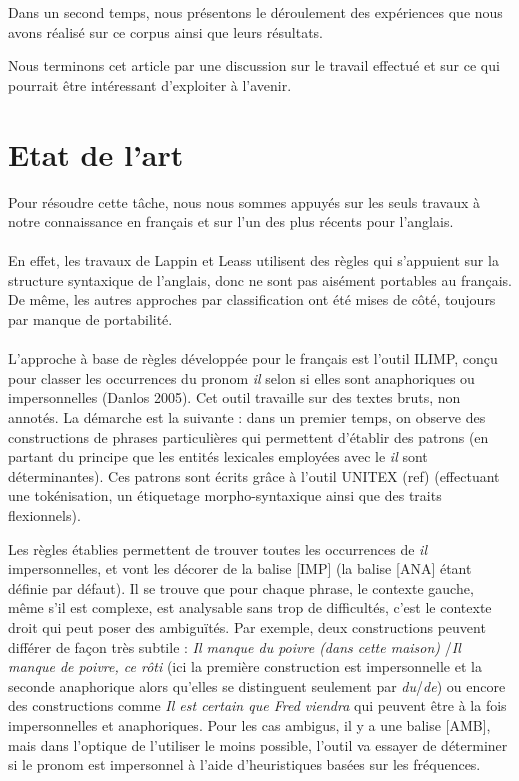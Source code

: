 \documentclass[a4paper,12pt]{article}
\begin{document}
Dans un second temps, nous présentons le déroulement des expériences que nous avons réalisé sur ce corpus ainsi que leurs résultats.

Nous terminons cet article par une discussion sur le travail effectué et sur ce qui pourrait être intéressant d'exploiter à l'avenir.


\section{Etat de l'art}

Pour résoudre cette tâche, nous nous sommes appuyés sur les seuls travaux à notre connaissance en français et sur l'un des plus récents pour l'anglais.

\paragraph{}
En effet, les travaux de Lappin et Leass utilisent des règles qui s'appuient sur la structure syntaxique de l'anglais, donc ne sont pas aisément portables au français. De même, les autres approches par classification ont été mises de côté, toujours par manque de portabilité.

\paragraph{}
L'approche à base de règles développée pour le français est l'outil ILIMP, conçu pour classer les occurrences du pronom \og{}\textit{il}\fg{} selon si elles sont anaphoriques ou impersonnelles (Danlos 2005). Cet outil travaille sur des textes bruts, non annotés.
La démarche est la suivante : dans un premier temps, on observe des constructions de phrases particulières qui permettent d'établir des patrons (en partant du principe que les entités lexicales employées avec le \og{}\textit{il}\fg{} sont déterminantes). Ces patrons sont écrits grâce à l'outil UNITEX (ref) (effectuant une tokénisation, un étiquetage morpho-syntaxique ainsi que des traits flexionnels).

Les règles établies permettent de trouver toutes les occurrences de \og{}\textit{il}\fg{} impersonnelles, et vont les décorer de la balise [IMP] (la balise [ANA] étant définie par défaut).
Il se trouve que pour chaque phrase, le contexte gauche, même s'il est complexe, est analysable sans trop de difficultés, c'est le contexte droit qui peut poser des ambiguïtés. Par exemple, deux constructions peuvent différer de façon très subtile : \og \textit{Il manque du poivre (dans cette maison)} \fg{}/\og \textit{Il manque de poivre, ce rôti} \fg{} (ici la première construction est impersonnelle et la seconde anaphorique alors qu'elles se distinguent seulement par \textit{du}/\textit{de}) ou encore des constructions comme \og \textit{Il est certain que Fred viendra} \fg{}  qui peuvent être à la fois impersonnelles et anaphoriques. 
Pour les cas ambigus, il y a une balise [AMB], mais dans l'optique de l'utiliser le moins possible, l'outil va essayer de déterminer si le pronom est impersonnel à l'aide d'heuristiques basées sur les fréquences.
\end{document}
